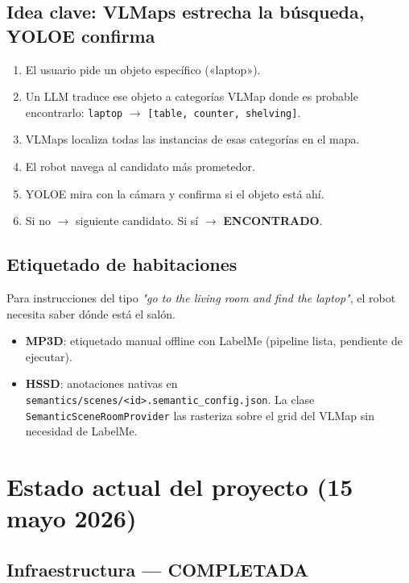 \documentclass[11pt,a4paper]{article}
\begin{document}
\subsection{Idea clave: VLMaps estrecha la búsqueda, YOLOE confirma}

\begin{enumerate}
  \item El usuario pide un objeto específico («laptop»).
  \item Un LLM traduce ese objeto a categorías VLMap donde es probable encontrarlo:
        \texttt{laptop} $\rightarrow$ \texttt{[table, counter, shelving]}.
  \item VLMaps localiza todas las instancias de esas categorías en el mapa.
  \item El robot navega al candidato más prometedor.
  \item YOLOE mira con la cámara y confirma si el objeto está ahí.
  \item Si no $\rightarrow$ siguiente candidato. Si sí $\rightarrow$ \textbf{ENCONTRADO}.
\end{enumerate}

\subsection{Etiquetado de habitaciones}

Para instrucciones del tipo \textit{"go to the living room and find the laptop"}, el robot
necesita saber dónde está el salón.

\begin{itemize}
  \item \textbf{MP3D}: etiquetado manual offline con LabelMe (pipeline lista, pendiente de ejecutar).
  \item \textbf{HSSD}: anotaciones nativas en \texttt{semantics/scenes/<id>.semantic\_config.json}.
        La clase \texttt{SemanticSceneRoomProvider} las rasteriza sobre el grid del VLMap sin
        necesidad de LabelMe.
\end{itemize}

\section{Estado actual del proyecto (15 mayo 2026)}

\subsection{Infraestructura --- \textcolor{done}{COMPLETADA}}
\end{document}
